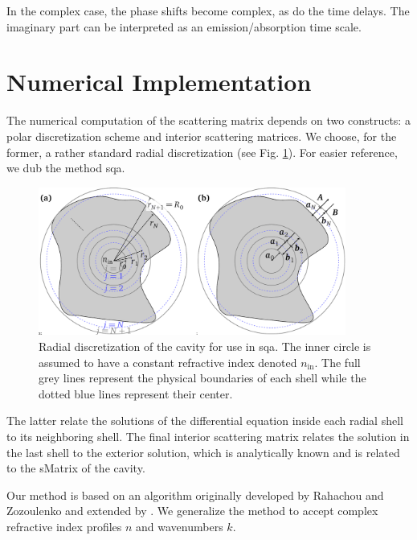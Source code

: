 
In the complex case, the phase shifts become complex, as do the 
time delays. The imaginary part can be interpreted as an 
emission/absorption time scale. 

\section{Numerical Implementation}
The numerical computation of the scattering matrix 
depends on two constructs: a polar discretization 
scheme and interior scattering matrices. We choose, for
the former, a rather standard radial discretization (see Fig. \ref{fig:passive.numerical.radialDiscretization}).
For easier reference, we dub the method \gls{sqa}.

\begin{figure}
 \centering
 \includegraphics[width=0.9\textwidth]{figs/passive/figDisScatCoeff.pdf}
 \caption[Radial discretization for use in SQA]
	 {Radial discretization of the cavity for use in \gls{sqa}. The inner circle is assumed to 
	 have a constant refractive index denoted $n_\text{in}$. The full grey lines represent
	 the physical boundaries of each shell while the dotted blue lines represent their
	 center.}
  \label{fig:passive.numerical.radialDiscretization}
\end{figure}


The latter relate the solutions of the differential equation 
inside each radial shell to its neighboring shell. The final
interior scattering matrix relates the solution in the last shell
to the exterior solution, which is analytically known and is 
related to the \gls{sMatrix} of the cavity.

Our method is based on an algorithm originally developed by 
Rahachou and Zozoulenko \cite{RAH2004} and extended by \cite{GAP2013}. 
We generalize the method to accept complex refractive index
profiles $n$ and wavenumbers $k$. 

